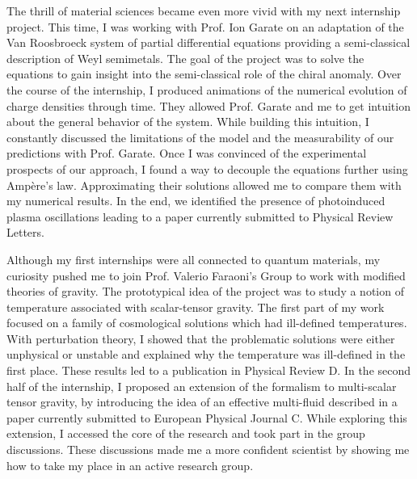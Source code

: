 \documentclass[12pt]{article}
\begin{document}
The thrill of material sciences became even more vivid with my next internship project. This time, I was working with Prof. Ion Garate on an adaptation of the Van Roosbroeck system of partial differential equations providing a semi-classical description of Weyl semimetals. The goal of the project was to solve the equations to gain insight into the semi-classical role of the chiral anomaly. Over the course of the internship, I produced animations of the numerical evolution of charge densities through time. They allowed Prof. Garate and me to get intuition about the general behavior of the system. While building this intuition, I constantly discussed the limitations of the model and the measurability of our predictions with Prof. Garate. Once I was convinced of the experimental prospects of our approach, I found a way to decouple the equations further using Ampère's law. Approximating their solutions allowed me to compare them with my numerical results. In the end, we identified the presence of photoinduced plasma oscillations leading to a paper currently submitted to Physical Review Letters. 
\vspace{0.4cm}   


Although my first internships were all connected to quantum materials, my curiosity pushed me to join Prof. Valerio Faraoni's Group to work with modified theories of gravity. The prototypical idea of the project was to study a notion of temperature associated with scalar-tensor gravity. The first part of my work focused on a family of cosmological solutions which had ill-defined temperatures. With perturbation theory, I showed that the problematic solutions were either unphysical or unstable and explained why the temperature was ill-defined in the first place. These results led to a publication in Physical Review D. In the second half of the internship, I proposed an extension of the formalism to multi-scalar tensor gravity, by introducing the idea of an effective multi-fluid described in a paper currently submitted to European Physical Journal C. While exploring this extension, I accessed the core of the research and took part in the group discussions. These discussions made me a more confident scientist by showing me how to take my place in an active research group.  \vspace{0.4cm}   
\end{document}
